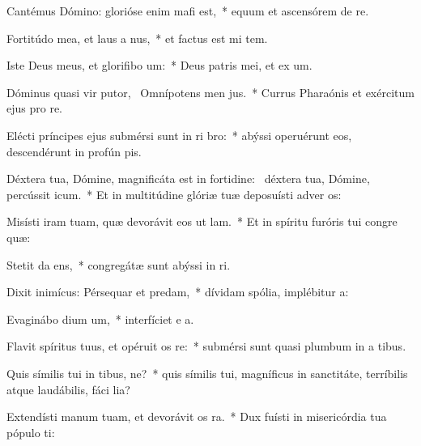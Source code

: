 \item Cantémus Dómino: glorióse enim mafi est,~* equum et ascensórem de  re.
\item Fortitúdo mea, et laus a nus,~* et factus est mi  tem.
\item Iste Deus meus, et glorifibo um:~* Deus patris mei, et ex um.
\item Dóminus quasi vir putor,~\pscross{} Omnípotens men jus.~* Currus Pharaónis et exércitum ejus pro  re.
\item Elécti príncipes ejus submérsi sunt in ri bro:~* abýssi operuérunt eos, descendérunt in profún  pis.
\item Déxtera tua, Dómine, magnificáta est in fortidine:~\pscross{} déxtera tua, Dómine, percússit icum.~* Et in multitúdine glóriæ tuæ deposuísti adver os:
\item Misísti iram tuam, quæ devorávit eos ut lam.~* Et in spíritu furóris tui congre  quæ:
\item Stetit da ens,~* congregátæ sunt abýssi in  ri.
\item Dixit inimícus: Pérsequar et predam,~* dívidam spólia, implébitur  a:
\item Evaginábo dium um,~* interfíciet e  a.
\item Flavit spíritus tuus, et opéruit os re:~* submérsi sunt quasi plumbum in a tibus.
\item Quis símilis tui in tibus, ne?~* quis símilis tui, magníficus in sanctitáte, terríbilis atque laudábilis, fáci lia?
\item Extendísti manum tuam, et devorávit os ra.~* Dux fuísti in misericórdia tua pópulo  ti:
